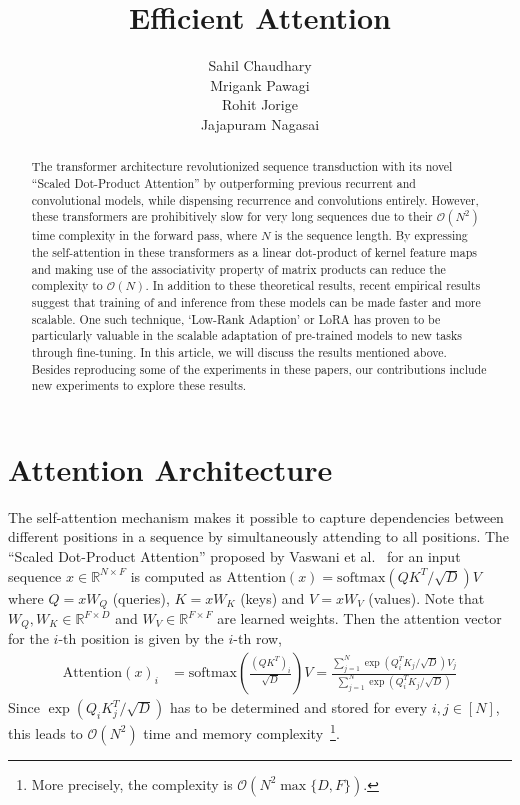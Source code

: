 \documentclass{article}
\title{Efficient Attention}
\author{
  Sahil Chaudhary \\
  \And
  Mrigank Pawagi \\
  \And
  Rohit Jorige \\
  \And
  Jajapuram Nagasai \\
}
\newcommand{\R}{\mathbb{R}}
\begin{document}
\maketitle


\begin{abstract}
    The transformer architecture revolutionized sequence transduction with its novel ``Scaled Dot-Product Attention'' by outperforming previous recurrent and convolutional models, while dispensing recurrence and convolutions entirely. However, these transformers are prohibitively slow for very long sequences due to their $\mathcal{O}(N^2)$ time complexity in the forward pass, where $N$ is the sequence length. By expressing the self-attention in these transformers as a linear dot-product of kernel feature maps and making use of the associativity property of matrix products can reduce the complexity to $\mathcal{O}(N)$. In addition to these theoretical results, recent empirical results suggest that training of and inference from these models can be made faster and more scalable. One such technique, `Low-Rank Adaption' or LoRA has proven to be particularly valuable in the scalable adaptation of pre-trained models to new tasks through fine-tuning. In this article, we will discuss the results mentioned above. Besides reproducing some of the experiments in these papers, our contributions include new experiments to explore these results.
\end{abstract}

\section{Attention Architecture}
    The self-attention mechanism makes it possible to capture dependencies between different positions in a sequence by simultaneously attending to all positions. The ``Scaled Dot-Product Attention'' proposed by Vaswani et al.~\cite{vaswaniAttention} for an input sequence $x \in \R^{N \times F}$ is computed as $\text{Attention}(x) = \text{softmax}(QK^T/\sqrt{D})V$
    where $Q = xW_Q$ (queries), $K = xW_K$ (keys) and $V = xW_V$ (values). Note that $W_Q, W_K \in \R^{F \times D}$ and $W_V \in \R^{F \times F}$ are learned weights. Then the attention vector for the $i$-th position is given by the $i$-th row,
    \begin{align*}
        \text{Attention}(x)_i &= \text{softmax}\left(\frac{(QK^T)_i}{\sqrt{D}} \right) V = \frac{\sum_{j=1}^N \exp(Q_i^TK_j/\sqrt{D})V_j}{\sum_{j=1}^N \exp(Q_i^TK_j/\sqrt{D})} 
    \end{align*}
    Since $\exp(Q_i K_j^T / \sqrt{D})$ has to be determined and stored for every $i, j \in [N]$, this leads to $\mathcal{O}(N^2)$ time and memory complexity~\footnote{More precisely, the complexity is $\mathcal{O}(N^2\max\{D, F\})$.}.
\end{document}

